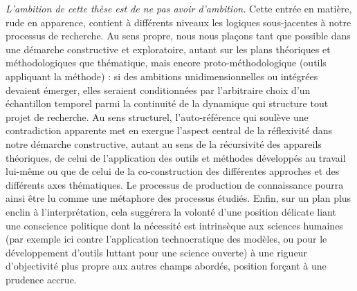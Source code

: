 {
\emph{L'ambition de cette thèse est de ne pas avoir d'ambition.}
 Cette entrée en matière, rude en apparence, contient à différents niveaux les logiques sous-jacentes à notre processus de recherche. Au sens propre, nous nous plaçons tant que possible dans une démarche constructive et exploratoire, autant sur les plans théoriques et méthodologiques que thématique, mais encore proto-méthodologique (outils appliquant la méthode) : si des ambitions unidimensionnelles ou intégrées devaient émerger, elles seraient conditionnées par l'arbitraire choix d'un échantillon temporel parmi la continuité de la dynamique qui structure tout projet de recherche. Au sens structurel, l'auto-référence qui soulève une contradiction apparente met en exergue l'aspect central de la réflexivité dans notre démarche constructive, autant au sens de la récursivité des appareils théoriques, de celui de l'application des outils et méthodes développés au travail lui-même ou que de celui de la co-construction des différentes approches et des différents axes thématiques. Le processus de production de connaissance pourra ainsi être lu comme une métaphore des processus étudiés. Enfin, sur un plan plus enclin à l'interprétation, cela suggérera la volonté d'une position délicate liant une conscience politique dont la nécessité est intrinsèque aux sciences humaines (par exemple ici contre l'application technocratique des modèles, ou pour le développement d'outils luttant pour une science ouverte) à une rigueur d'objectivité plus propre aux autres champs abordés, position forçant à une prudence accrue.
}

